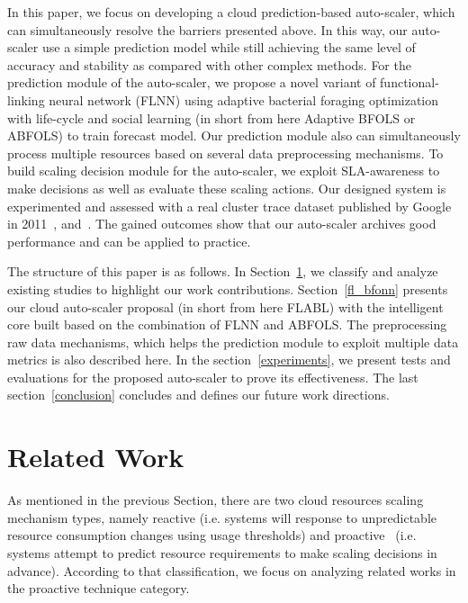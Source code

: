 \documentclass[runningheads]{llncs}
\begin{document}
 
In this paper, we focus on developing a cloud prediction-based auto-scaler, which can simultaneously resolve the barriers presented above. In this way, our auto-scaler use a simple prediction model while still achieving the same level of accuracy and stability as compared with other complex methods. For the prediction module of the auto-scaler, we propose a novel variant of functional-linking neural network (FLNN) using adaptive bacterial foraging optimization with life-cycle and social learning (in short from here Adaptive BFOLS or ABFOLS) to train forecast model. Our prediction module also can simultaneously process multiple resources based on several data preprocessing mechanisms. To build scaling decision module for the auto-scaler, we exploit SLA-awareness to make decisions as well as evaluate these scaling actions. Our designed system is experimented and assessed with a real cluster trace dataset published by Google in 2011~\cite{clusterdata:Reiss2011}, and~\cite{ref_google_trace}. The gained outcomes show that our auto-scaler archives good performance and can be applied to practice.

The structure of this paper is as follows. In Section~\ref{related_work}, we classify and analyze existing studies to highlight our work contributions. Section~\ref{fl_bfonn} presents our cloud auto-scaler proposal (in short from here FLABL) with the intelligent core built based on the combination of FLNN and ABFOLS. The preprocessing raw data mechanisms, which helps the prediction module to exploit multiple data metrics is also described here. In the section~\ref{experiments}, we present tests and evaluations for the proposed auto-scaler to prove its effectiveness. The last section~\ref{conclusion} concludes and defines our future work directions.

\section{Related Work}
\label{related_work}

As mentioned in the previous Section, there are two cloud resources scaling mechanism types, namely reactive (i.e. systems will response to unpredictable resource consumption changes using usage thresholds) and proactive~\cite{ref_lorido} (i.e. systems attempt to predict resource requirements to make scaling decisions in advance). According to that classification, we focus on analyzing related works in the proactive technique category. 
\end{document}
